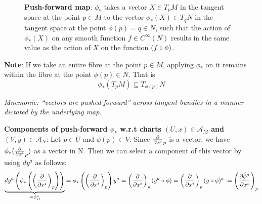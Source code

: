 \begin{SCfigure}[5][h]
\label{fig:L11_pushForwardMap}
  \centering
    \caption{\textbf{Push-forward map}: $\phi_\ast$ takes a vector $X \in T_pM$ in the tangent space at the point $p \in M$ to the vector $\phi_\ast(X) \in T_qN$ in the tangent space at the point $\phi(p) = q \in N$, such that the action of $\phi_\ast(X)$ on any smooth function $f \in C^\infty(N)$ results in the same value as the action of $X$ on the function $(f \after \phi)$.}
\end{SCfigure}

\textbf{Note}: If we take an entire fibre at the point $p \in M$, applying $\phi_\ast$ on it remains within the fibre at the point $\phi(p) \in N$. That is \\
\[
\phi_\ast(T_pM) \subseteq T_{\phi(p)}N
\]

\textit{Mnemonic: ``vectors are pushed forward'' across tangent bundles in a manner dictated by the underlying map.}

\textbf{Components of push-forward $\phi_\ast$ w.r.t charts $(U,x) \in \mathcal{A}_M$ and $(V,y) \in \mathcal{A}_N$}: Let $p \in U$ and $\phi(p) \in V$. Since $\cibasis{x^i}_p$ is a vector, we have $\phi_\ast(\cibasis{x^i}_p)$ as a vector in N. Then we can select a component of this vector by using $dy^a$ as follows: \\
\begin{equation} \label{eq_pushForwardComponents}
\underbrace{dy^a\left(\phi_\ast\left(\left(\cibasis{x^i}\right)_p\right)\right)}_{:= \phi^a_{\ast i}} = \phi_\ast\left(\left(\cibasis{x^i}\right)_p\right)y^a = \left(\cibasis{x^i}\right)_p (y^a \after \phi) = \left(\cibasis{x^i}\right)_p (y \after \phi)^a := \left(\cibasis[\hat{\phi}^a]{x^i}\right)_p
\end{equation}

